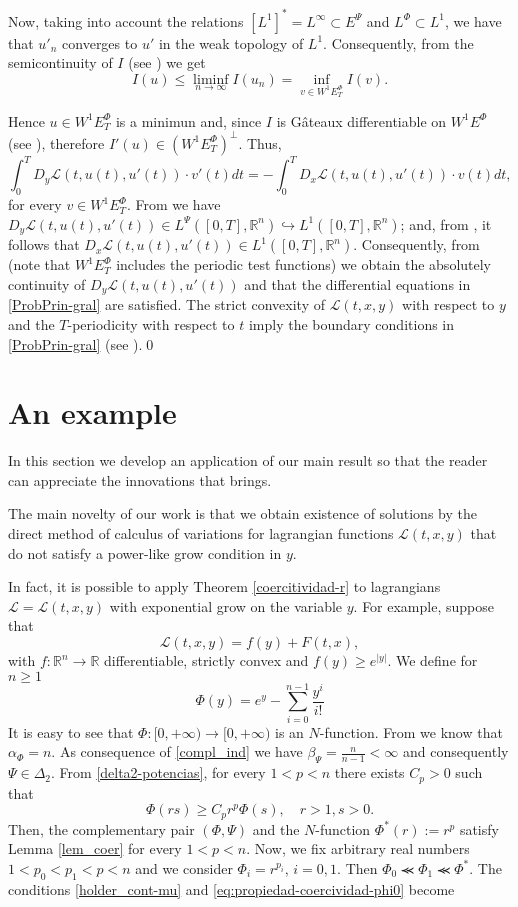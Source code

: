 \documentclass[twoside]{article}
\theoremstyle{remark}
\newcommand{\lphi}{L^{\Phi}}
\newcommand{\lpsi}{L^{\Psi}}
\newcommand{\ephi}{E^{\Phi}}
\newcommand{\wphiet}{W^{1}\ephi_T}
\newcommand{\wphie}{W^{1}\ephi}
\newcommand{\rr}{\mathbb{R}}
\renewcommand{\leq}{\leqslant}
\renewcommand{\geq}{\geqslant}
\newcommand{\epsi}{E^{\Psi}}
\newcounter{example}
\begin{document}
Now, taking into account the relations $\left[L^1\right]^*=L^{\infty}\subset  \epsi$ and $\lphi\subset L^1$, we have that $u'_n$ converges to $u'$ in the weak topology of $L^1$. Consequently,  from the semicontinuity of $I$ (see \cite[Lemma 6.1]{ABGMS2015})  we get 
\[I(u)\leq  \liminf_{n\to\infty}I(u_n)=\inf\limits_{v\in\wphie_T}I(v).\]

Hence $u\in \wphiet$ is a minimun and, since $I$ is G\^ateaux differentiable on $\wphie$ (see  \cite[Thm. 3.2]{ABGMS2015}), 
therefore $I'(u)\in (\wphiet)^{\perp}$. Thus,
\[\int_0^T D_y\mathcal{L}(t,u(t),u'(t))\cdot v'(t)dt =-\int_0^T D_x\mathcal{L}(t,u(t),u'(t))\cdot v(t)dt,\]
for every  $v\in \wphiet$.  
From \cite[Eq. (26)]{ABGMS2015} we have
 $D_y\mathcal{L}(t,u(t),u'(t))\in \lpsi([0,T],\rr^n)\hookrightarrow L^1([0,T],\rr^n)$;
and,  from  \cite[Eq. (24)]{ABGMS2015}, it follows that $D_x\mathcal{L}(t,u(t),u'(t))\in L^1([0,T],\rr^n)$. 
Consequently, from \cite[p. 6]{mawhin2010critical} 
(note that $\wphiet$  includes the periodic test functions) we obtain the absolutely continuity of $D_y\mathcal{L}(t,u(t),u'(t))$ and that the differential equations in \eqref{ProbPrin-gral} are satisfied. The strict convexity of $\mathcal{L}(t,x,y)$ with respect to $y$ and the $T$-periodicity with respect to $t$ imply the boundary conditions in  \eqref{ProbPrin-gral} (see \cite[Thm. 4.1]{ABGMS2015}).\qed




 \section{An example}\label{sec:examples}

 In this section we develop  an application of our main result
so that the reader can appreciate the innovations that brings.


The main novelty  of our work is that we obtain existence of solutions by the direct method of calculus of variations for lagrangian functions $\mathcal{L}(t,x,y)$ that do not satisfy a power-like grow condition in $y$.

In fact, it is possible to apply Theorem \ref{coercitividad-r} to lagrangians $\mathcal{L}=\mathcal{L}(t,x,y)$ with  exponential grow on the variable $y$. For example, suppose that
  \[\mathcal{L}(t,x,y)=f(y)+F(t,x),\]
with $f:\rr^n\to\rr$ differentiable, strictly convex and $f(y)\geq e^{|y|}$. We define for $n\geq 1$
\[\Phi(y)=e^y-\sum\limits_{i=0}^{n-1}\frac{y^i}{i!}  \]
It is easy to see that $\Phi:[0,+\infty)\to [0,+\infty)$  is an $N$-function. 
From \cite[Ex. 3, p. 85]{M} we know that $\alpha_{\Phi}=n$. 
As consequence of \eqref{compl_ind} we have $\beta_{\Psi}=\frac{n}{n-1}<\infty$ and consequently $\Psi\in\Delta_2$. 
From \eqref{delta2-potencias}, for every $1<p<n$ there exists $C_p>0$ such that
\[\Phi(rs)\geq C_pr^p\Phi(s),\quad r>1,s>0.\]
Then, the complementary pair $(\Phi,\Psi)$ and the $N$-function $\Phi^*(r):=r^p$ satisfy Lemma \ref{lem_coer} for every $1<p<n$. 
Now, we fix arbitrary real numbers $1<p_0<p_1<p<n$ and we consider $\Phi_i=r^{p_i}$, $i=0,1$. 
Then $\Phi_0\llcurly \Phi_1\llcurly \Phi^*$.
The conditions  \eqref{holder_cont-mu} and     \eqref{eq:propiedad-coercividad-phi0} become
\end{document}
